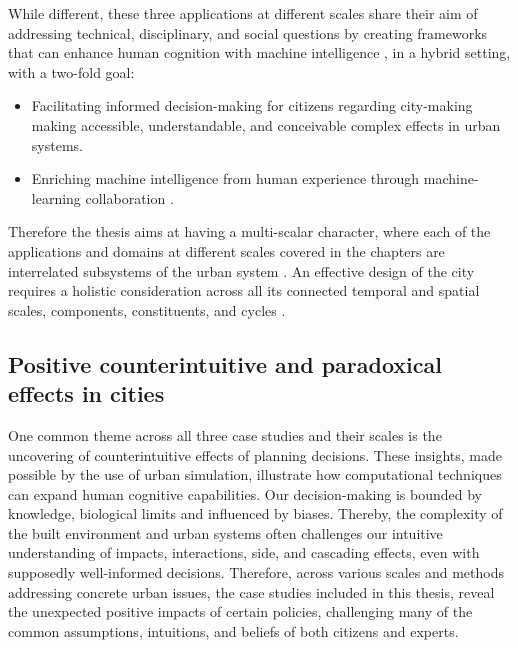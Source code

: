 While different, these three applications at different scales share their aim of addressing technical, disciplinary, and social questions by creating frameworks that can enhance human cognition with machine intelligence \citep{Licklider1960}, in a hybrid setting, with a two-fold goal:
\begin{itemize}
    \item Facilitating informed decision-making for citizens regarding city-making making accessible, understandable, and conceivable complex effects in urban systems.
    \item Enriching machine intelligence from human experience through machine-learning collaboration \citep{Licklider1960}.
\end{itemize}


Therefore the thesis aims at having a multi-scalar character, where each of the applications and domains at different scales covered in the chapters are interrelated subsystems of the urban system \citep{Batty2013}. An effective design of the city requires a holistic consideration across all its connected temporal and spatial scales, components, constituents, and cycles \citep{Gaffron2005}. 

\subsection{Positive counterintuitive and paradoxical effects in cities}
One common theme across all three case studies and their scales is the uncovering of counterintuitive effects of planning decisions. These insights, made possible by the use of urban simulation, illustrate how computational techniques can expand human cognitive capabilities. Our decision-making is bounded by knowledge, biological limits and influenced by biases. Thereby, the complexity of the built environment and urban systems often challenges our intuitive understanding of impacts, interactions, side, and cascading effects, even with supposedly well-informed decisions. Therefore, across various scales and methods addressing concrete urban issues, the case studies included in this thesis, reveal the unexpected positive impacts of certain policies, challenging many of the common assumptions, intuitions, and beliefs of both citizens and experts. 

